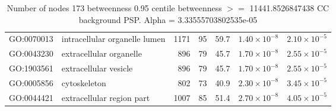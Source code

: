 \begin{table}[ht]
\begin{adjustbox}{max width=\textwidth}
\begin{tabular}{llrrrrr}
  GO:0070013 & intracellular organelle lumen & 1171 & 95 & 59.7 & $1.40 \times 10^{-8}$ & $2.10 \times 10^{-5}$ \\ 
  GO:0043230 & extracellular organelle & 896 & 79 & 45.7 & $1.70 \times 10^{-8}$ & $2.55 \times 10^{-5}$ \\ 
  GO:1903561 & extracellular vesicle & 896 & 79 & 45.7 & $1.70 \times 10^{-8}$ & $2.55 \times 10^{-5}$ \\ 
  GO:0005856 & cytoskeleton & 802 & 73 & 40.9 & $2.30 \times 10^{-8}$ & $3.45 \times 10^{-5}$ \\ 
  GO:0044421 & extracellular region part & 1007 & 85 & 51.4 & $2.70 \times 10^{-8}$ & $4.05 \times 10^{-5}$ \\ 
   \hline
\end{tabular}
\end{adjustbox}
\caption{Number of nodes 173 betweenness 0.95 centile  betweenness $>=$ 11441.8526847438 CC background PSP. Alpha = 3.33555703802535e-05} 
\label{tab:Number of nodes 173 betweenness 0.95 centile  betweenness $>=$ 11441.8526847438 CC background PSP. Alpha = 3.33555703802535e-05}
\end{table}



